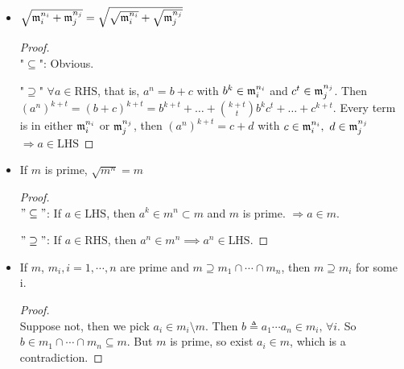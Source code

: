 \begin{prop} \leavevmode \label{prop:radical-power-relation} 
  \begin{itemize}
    \item  $\sqrt{\mathfrak{m}_i^{n_i} + \mathfrak{m}_j^{n_j}} = \sqrt{\sqrt{\mathfrak{m}_i^{n_i}} + 
      \sqrt{\mathfrak{m}_j^{n_j}}}$
      \begin{proof} $ $\\ 
        "$\subseteq$": Obvious.

        "$\supseteq$" $\forall a \in \text{RHS}$, that is, $a^n = b + c$ with 
        $b^k \in \mathfrak{m}_i^{n_i}$ and $c^t \in \mathfrak{m}_j^{n_j}$. Then 
        $(a^n)^{k+t} = (b + c)^{k + t} = b^{k+t} + \dots + {{k+t} \choose t} b^kc^t
        + \dots + c^{k+t}$. Every term is in either $\mathfrak{m}_i^{n_i}$ or $\mathfrak{m}_j^{n_j}$,
         then $(a^n)^{k+t} = c + d$ with $c \in \mathfrak{m}_i^{n_i},\ d \in \mathfrak{m}_j^{n_j}$
         $\Rightarrow a \in \text{LHS}$
      \end{proof}
    \item If $m$ is prime, $\sqrt{m^{n}} = m$
      \begin{proof} $ $\\
        $"\subseteq"$: If $a \in \text{LHS}$, then $a^k \in m^{n} \subset m$ and $m$ is prime.
        $\Rightarrow a \in m$.

        $"\supseteq"$: If $a \in \text{RHS}$, then $a^n \in m^n \implies a^n \in \text{LHS}$.
      \end{proof}
     \item If $m$, $m_i, i = 1, \cdots, n$ are prime and $m \supseteq m_1 \cap
       \cdots \cap m_n$, then $m \supseteq m_i$ for some i.
       \begin{proof} $ $\\
         Suppose not, then we pick $a_i \in m_i \setminus m$. Then $b \triangleq a_1\cdots a_n \in m_i
         , \, \forall i$. So $b \in m_1 \cap \cdots \cap m_n \subseteq m$. But
         $m$ is prime, so exist $a_i \in m$, which is a contradiction. 
       \end{proof}
  \end{itemize}
\end{prop}


